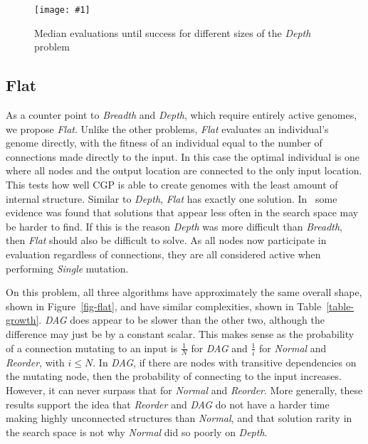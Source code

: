 \documentclass{sig-alternate}
\newcommand{\includegraphicsfit}[1]
{\texttt{[image: \#1]}}
\begin{document}
\begin{figure}
  \centering
  \includegraphicsfit{depth}
  \caption{Median evaluations until success for different sizes of the \emph{Depth} problem} 
  \label{fig-depth}
\end{figure}

\subsection{Flat}
As a counter point to \emph{Breadth} and \emph{Depth}, which require entirely
active genomes, we propose \emph{Flat}.  Unlike the other problems, \emph{Flat}
evaluates an individual's genome directly, with the fitness of
an individual equal to the number of connections made directly to the input.
In this case the optimal individual is one where all nodes and the output location
are connected to the only input location.  This tests how well CGP is able to
create genomes with the least amount of internal structure.
Similar to \emph{Depth}, \emph{Flat} has exactly one solution. 
In~\cite{payne:2009:bias} some evidence was found that solutions
that appear less often in the search space may be harder to find.  If this is the reason
\emph{Depth} was more difficult than \emph{Breadth}, then \emph{Flat} should also
be difficult to solve.  As all nodes now
participate in evaluation regardless of connections, they are all considered active
when performing \emph{Single} mutation.

On this problem, all three algorithms have approximately the same overall shape, shown
in Figure~\ref{fig-flat}, and have similar complexities, shown in Table~\ref{table-growth}.
\emph{DAG} does appear to be slower than the other two, although the difference may
just be by a constant scalar.  This makes sense as the probability of a connection
mutating to an input is $\frac{1}{N}$ for \emph{DAG} and $\frac{1}{i}$ for
\emph{Normal} and \emph{Reorder}, with $i\leq N$.  In \emph{DAG}, if there are nodes with
transitive dependencies on the mutating node, then the probability
of connecting to the input increases.  However, it can never surpass that for \emph{Normal}
and \emph{Reorder}.  More generally, these results support the idea that \emph{Reorder}
and \emph{DAG} do not have a harder time making highly unconnected structures
than \emph{Normal}, and that solution rarity in the search space is not why \emph{Normal}
did so poorly on \emph{Depth}.
\end{document}
